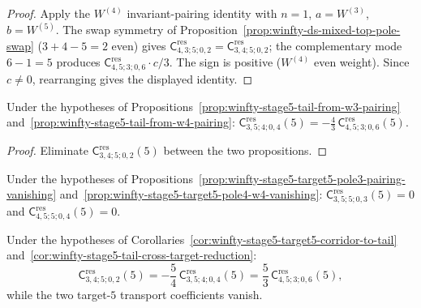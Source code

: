 \begin{proof}
Apply the $W^{(4)}$ invariant-pairing identity with \(n=1\), \(a=W^{(3)}\), \(b=W^{(5)}\).  The swap symmetry of Proposition~\ref{prop:winfty-ds-mixed-top-pole-swap} (\(3+4-5=2\) even) gives \(\mathsf{C}^{\mathrm{res}}_{4,3;5;0,2}=\mathsf{C}^{\mathrm{res}}_{3,4;5;0,2}\); the complementary mode \(6-1=5\) produces \(\mathsf{C}^{\mathrm{res}}_{4,5;3;0,6}\cdot c/3\).  The sign is positive (\(W^{(4)}\) even weight).  Since \(c\neq 0\), rearranging gives the displayed identity.
\end{proof}

\begin{corollary}
\label{cor:winfty-stage5-tail-cross-target-reduction}
Under the hypotheses of
Propositions~\ref{prop:winfty-stage5-tail-from-w3-pairing}
and~\ref{prop:winfty-stage5-tail-from-w4-pairing}:
$\mathsf{C}^{\mathrm{res}}_{3,5;4;0,4}(5)
=
-\frac{4}{3}\,
\mathsf{C}^{\mathrm{res}}_{4,5;3;0,6}(5)$.
\end{corollary}

\begin{proof}
Eliminate \(\mathsf{C}^{\mathrm{res}}_{3,4;5;0,2}(5)\) between the two propositions.
\end{proof}

\begin{corollary}
\label{cor:winfty-stage5-target5-corridor-to-tail}
Under the hypotheses of
Propositions~\ref{prop:winfty-stage5-target5-pole3-pairing-vanishing}
and~\ref{prop:winfty-stage5-target5-pole4-w4-vanishing}:
$\mathsf{C}^{\mathrm{res}}_{3,5;5;0,3}(5)=0$ and
$\mathsf{C}^{\mathrm{res}}_{4,5;5;0,4}(5)=0$.
\end{corollary}

\begin{corollary}
\label{cor:winfty-stage5-target5-no-new-independent-data}
Under the hypotheses of
Corollaries~\ref{cor:winfty-stage5-target5-corridor-to-tail}
and~\ref{cor:winfty-stage5-tail-cross-target-reduction}:
\[
\mathsf{C}^{\mathrm{res}}_{3,4;5;0,2}(5)
=
-\frac{5}{4}\,\mathsf{C}^{\mathrm{res}}_{3,5;4;0,4}(5)
=
\frac{5}{3}\,\mathsf{C}^{\mathrm{res}}_{4,5;3;0,6}(5),
\]
while the two target-$5$ transport coefficients vanish.
\end{corollary}

